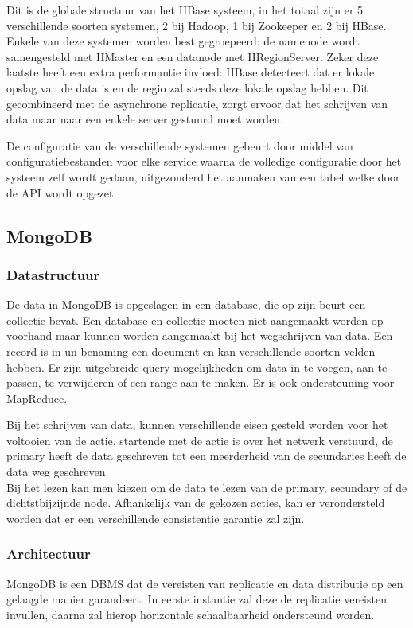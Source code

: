 Dit is de globale structuur van het HBase systeem, in het totaal zijn er 5 verschillende soorten systemen, 2 bij Hadoop, 1 bij Zookeeper en 2 bij HBase. Enkele van deze systemen worden best gegroepeerd: de namenode wordt samengesteld met HMaster en een datanode met HRegionServer. Zeker deze laatste heeft een extra performantie invloed: HBase detecteert dat er lokale opslag van de data is en de regio zal steeds deze lokale opslag hebben. Dit gecombineerd met de asynchrone replicatie, zorgt ervoor dat het schrijven van data maar naar een enkele server gestuurd moet worden. 

De configuratie van de verschillende systemen gebeurt door middel van configuratiebestanden voor elke service waarna de volledige configuratie door het systeem zelf wordt gedaan, uitgezonderd het aanmaken van een tabel welke door de API wordt opgezet. 

\subsection{MongoDB\cite{mongodb-manual}}

\subsubsection{Datastructuur}
De data in MongoDB is opgeslagen in een database, die op zijn beurt een collectie bevat. Een database en collectie moeten niet aangemaakt worden op voorhand maar kunnen worden aangemaakt bij het wegschrijven van data. Een record is in un benaming een document en kan verschillende soorten velden hebben. Er zijn uitgebreide query mogelijkheden om data in te voegen, aan te passen, te verwijderen of een range aan te maken. Er is ook ondersteuning voor MapReduce\cite{dean2008mapreduce}. 

Bij het schrijven van data, kunnen verschillende eisen gesteld worden voor het voltooien van de actie, startende met de actie is over het netwerk verstuurd, de primary heeft de data geschreven tot een meerderheid van de secundaries heeft de data weg geschreven. \\ Bij het lezen kan men kiezen om de data te lezen van de primary, secundary of de dichtstbijzijnde node. Afhankelijk van de gekozen acties, kan er verondersteld worden dat er een verschillende consistentie garantie zal zijn.

\subsubsection{Architectuur}
MongoDB is een DBMS dat de vereisten van replicatie en data distributie op een gelaagde manier garandeert. In eerste instantie zal deze de replicatie vereisten invullen, daarna zal hierop horizontale schaalbaarheid ondersteund worden. 

